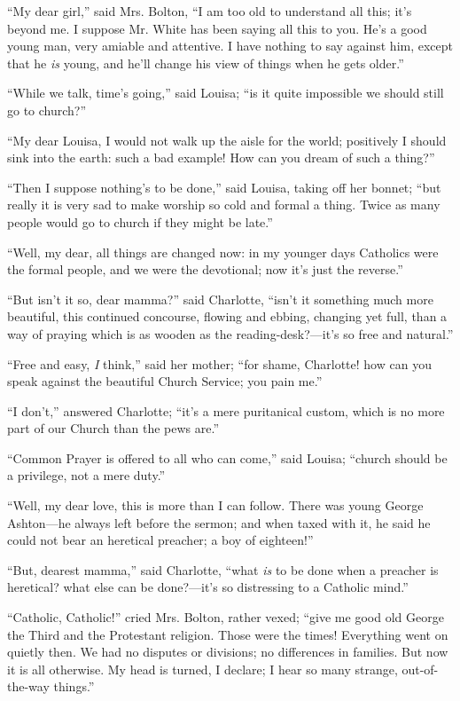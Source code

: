 ``My dear girl,'' said Mrs. Bolton, ``I am too old to
understand all this; it's beyond me. I suppose Mr. White has been
saying all this to you. He's a good young man, very amiable and
attentive. I have nothing to say against him, except that he \emph{is}
young, and he'll change his view of things when he gets older.''

``While we talk, time's going,'' said Louisa; ``is it
quite impossible we should still go to church?''

``My dear Louisa, I would not walk up the aisle for the world;
positively I should sink into the earth: such a bad example! How can
you dream of such a thing?''

``Then I suppose nothing's to be done,'' said Louisa,
taking off her bonnet; ``but really it is very sad to make worship
so cold and formal a thing. Twice as many people would go to
church if they might be late.''

``Well, my dear, all things are changed now: in my younger days
Catholics were the formal people, and we were the devotional; now it's
just the reverse.''

``But isn't it so, dear mamma?'' said Charlotte, ``isn't
it something much more beautiful, this continued concourse, flowing
and ebbing, changing yet full, than a way of praying which is as
wooden as the reading-desk?—it's so free and natural.''

``Free and easy, \emph{I} think,'' said her mother;
``for shame, Charlotte! how can you speak against the beautiful
Church Service; you pain me.''

``I don't,'' answered Charlotte; ``it's a mere
puritanical custom, which is no more part of our Church than the pews
are.''

``Common Prayer is offered to all who can come,'' said
Louisa; ``church should be a privilege, not a mere duty.''

``Well, my dear love, this is more than I can follow. There was
young George Ashton—he always left before the sermon; and when taxed
with it, he said he could not bear an heretical preacher; a boy of
eighteen!''

``But, dearest mamma,'' said Charlotte, ``what \emph{is}
to be done when a preacher is heretical? what else can be done?—it's
so distressing to a Catholic mind.''

``Catholic, Catholic!'' cried Mrs. Bolton, rather vexed;
``give me good old George the Third and the Protestant religion.
Those were the times! Everything went on quietly then. We had no
disputes or divisions; no differences in families. But now it is
all otherwise. My head is turned, I declare; I hear so many strange,
out-of-the-way things.''

